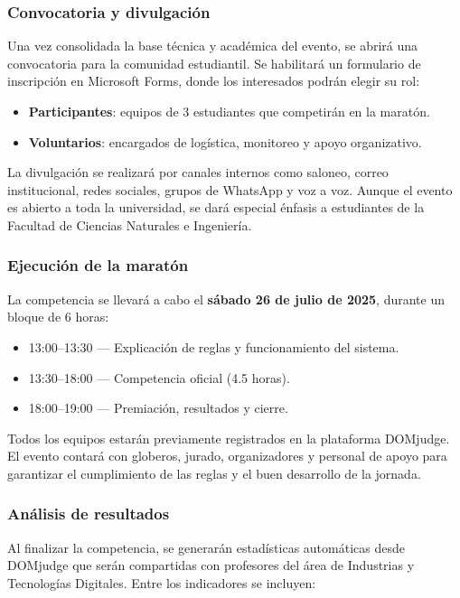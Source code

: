 \documentclass{article}
\begin{document}
\subsubsection{Convocatoria y divulgación}

Una vez consolidada la base técnica y académica del evento, se abrirá una convocatoria para la comunidad estudiantil. Se habilitará un formulario de inscripción en Microsoft Forms, donde los interesados podrán elegir su rol:

\begin{itemize}
  \item \textbf{Participantes}: equipos de 3 estudiantes que competirán en la maratón.
  \item \textbf{Voluntarios}: encargados de logística, monitoreo y apoyo organizativo.
\end{itemize}

La divulgación se realizará por canales internos como saloneo, correo institucional, redes sociales, grupos de WhatsApp y voz a voz. Aunque el evento es abierto a toda la universidad, se dará especial énfasis a estudiantes de la Facultad de Ciencias Naturales e Ingeniería.


\subsubsection{Ejecución de la maratón}
La competencia se llevará a cabo el \textbf{sábado 26 de julio de 2025}, durante un bloque de 6 horas:

\begin{itemize}
  \item 13:00–13:30 — Explicación de reglas y funcionamiento del sistema.
  \item 13:30–18:00 — Competencia oficial (4.5 horas).
  \item 18:00–19:00 — Premiación, resultados y cierre.
\end{itemize}

Todos los equipos estarán previamente registrados en la plataforma DOMjudge. El evento contará con globeros, jurado, organizadores y personal de apoyo para garantizar el cumplimiento de las reglas y el buen desarrollo de la jornada.

\subsubsection{Análisis de resultados}


Al finalizar la competencia, se generarán estadísticas automáticas desde DOMjudge que serán compartidas con profesores del área de Industrias y Tecnologías Digitales. Entre los indicadores se incluyen:
\end{document}
